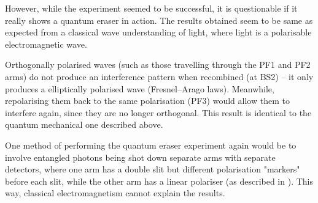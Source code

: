 \documentclass[a4paper]{scrartcl}
\begin{document}
However, while the experiment seemed to be successful, it is questionable if it really shows a quantum eraser in action. The results obtained seem to be same as expected from a classical wave understanding of light, where light is a polarisable electromagnetic wave.

Orthogonally polarised waves (such as those travelling through the PF1 and PF2 arms) do not produce an interference pattern when recombined (at BS2) -- it only produces a elliptically polarised wave (Fresnel--Arago laws). Meanwhile, repolarising them back to the same polarisation (PF3) would allow them to interfere again, since they are no longer orthogonal. This result is identical to the quantum mechanical one described above.

One method of performing the quantum eraser experiment again would be to involve entangled photons being shot down separate arms with separate detectors, where one arm has a double slit but different polarisation "markers" before each slit, while the other arm has a linear polariser (as described in \cite{Walborn2002}). This way, classical electromagnetism cannot explain the results.

\printbibliography
\end{document}

